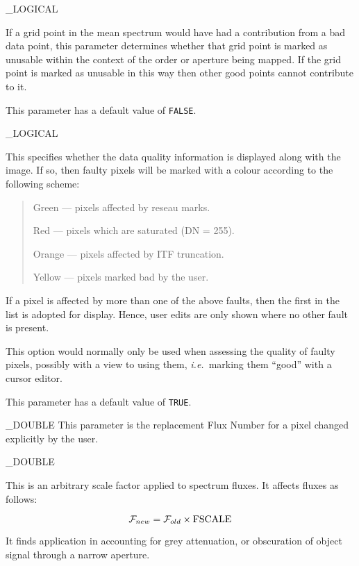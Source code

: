 {
{
   \_LOGICAL
}{
   If a grid point in the mean spectrum would have had a contribution
   from a bad data point, this parameter determines whether that
   grid point is marked as unusable within the context
   of the order or aperture being mapped.
   If the grid point is marked as unusable in this way then other
   good points cannot contribute to it.

   This parameter has a default value of \verb+FALSE+\@.
}

{
   \_LOGICAL
}{
   This specifies whether the data quality information is displayed
   along with the image.
   If so, then faulty pixels will be marked with a colour according to
   the following scheme:

   \begin {quote}
   \begin {description}
      \item Green --- pixels affected by reseau marks.
      \item Red --- pixels which are saturated (DN = 255).
      \item Orange --- pixels affected by ITF truncation.
      \item Yellow --- pixels marked bad by the user.
   \end {description}
   \end {quote}

   If a pixel is affected by more than one of the above faults, then
   the first in the list is adopted for display.
   Hence, user edits are only shown where no other fault is present.

   This option would normally only be used when assessing the quality
   of faulty pixels, possibly with a view to using them, {\it{i.e.}}\ marking
   them ``good'' with a cursor editor.

   This parameter has a default value of \verb+TRUE+\@.
}

{
   \_DOUBLE
}{
   This parameter is the replacement Flux Number for a pixel changed
   explicitly by the user.
}

{
   \_DOUBLE
}{
   This is an arbitrary scale factor applied to spectrum fluxes.
   It affects fluxes as follows:

   \begin {equation}
      {\cal F}_{new} = {\cal F}_{old} \times {\rm FSCALE}
   \end {equation}

   It finds application in accounting for grey attenuation, or obscuration
   of object signal through a narrow aperture.
}

}
